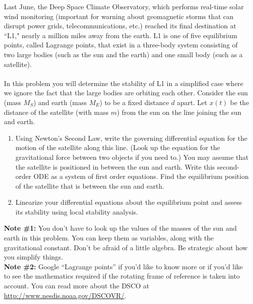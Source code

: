 \documentclass[12pt,letterpaper]{hmcpset}
\begin{document}
\begin{problem}[5]
    Last June, the Deep Space Climate Observatory, which performs
    real-time solar wind monitoring (important for warning about
    geomagnetic storms that can disrupt power grids,
    telecommunications, etc.) reached its final destination at ``L1,"
    nearly a million miles away from the earth.  L1 is one of five
    equilibrium points, called Lagrange points, that exist in a
    three-body system consisting of two large bodies (such as the sun
    and the earth) and one small body (such as a satellite).\\\\
    In this problem you will determine the stability of L1 in a
    simplified case where we ignore the fact that the large bodies are
    orbiting each other.  Consider the sun (mass $M_S$) and earth
    (mass $M_E$) to be a fixed distance $d$ apart. Let $x(t)$ be the
    distance of the satellite (with mass $m$) from the sun on the line
    joining the sun and earth.
    \begin{enumerate}
        \item Using Newton's Second Law, write the governing
            differential equation for the motion of the satellite along
            this line. (Look up the equation for the gravitational force
            between two objects if you need to.)  You may assume that
            the satellite is positioned in between the sun and
            earth. Write this second-order ODE as a system of first
            order equations.  Find the equilibrium position of the
            satellite that is between the sun and earth.
        \item Linearize your differential equations about the
            equilibrium point and assess its stability using local
            stability analysis.
    \end{enumerate}
    \textbf{Note \#1:} You don't have to look up the values of the
    masses of the sun and earth in this problem. You can keep them as
    variables, along with the gravitational constant. Don't be afraid
    of a little algebra. Be strategic about how you simplify things.\\
    \textbf{Note \#2:} Google ``Lagrange points'' if you'd like to
    know more or if you'd like to see the mathematics required if the
    rotating frame of reference is taken into account. You can read
    more about the DSCO at \url{http://www.nesdis.noaa.gov/DSCOVR/}.
\end{problem}
\begin{solution}
    \vfill
\end{solution}
\end{document}
